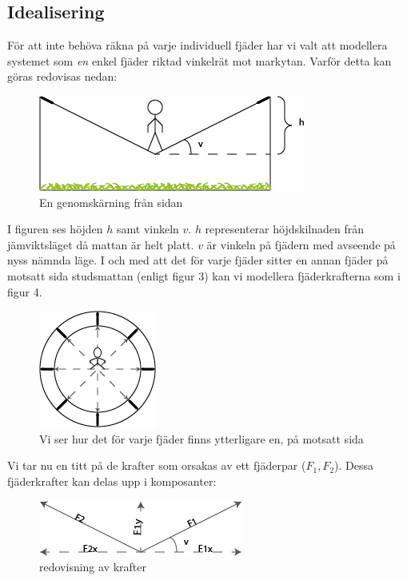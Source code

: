\documentclass[10pt,a4paper]{article}
\begin{document}
\subsection{Idealisering}
För att inte behöva räkna på varje individuell fjäder har vi valt att modellera systemet som \textit{en} enkel fjäder riktad vinkelrät mot markytan. Varför detta kan göras redovisas nedan:

\begin{figure}[ht]
\begin{center}
\includegraphics[scale=0.8]{fransidan}
\caption{En genomskärning från sidan}
\end{center}
\end{figure}
I figuren ses höjden $h$ samt vinkeln $v$. $h$ representerar höjdskilnaden från jämviktsläget då mattan är helt platt. $v$ är vinkeln på fjädern med avseende på nyss nämnda läge.
I och med att det för varje fjäder sitter en annan fjäder på motsatt sida studsmattan (enligt figur 3) kan vi modellera fjäderkrafterna som i figur 4.
\begin{figure}[ht]
\begin{center}
\includegraphics[scale=1]{ovanifran}
\caption{Vi ser hur det för varje fjäder finns ytterligare en, på motsatt sida}
\end{center}
\end{figure}

Vi tar nu en titt på de krafter som orsakas av ett fjäderpar ($F_1,F_2$). Dessa fjäderkrafter kan delas upp i komposanter:
\begin{figure}[ht]
\begin{center}
\includegraphics[scale=1]{krafter}
\caption{redovisning av krafter}
\end{center}
\end{figure}
\end{document}
